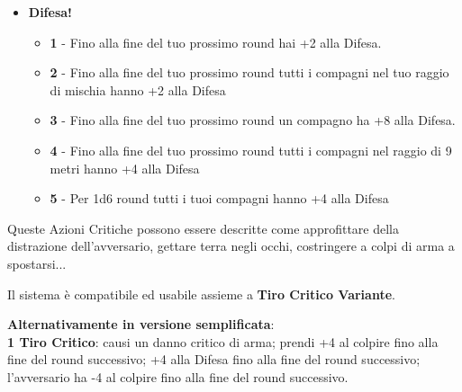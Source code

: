\begin{multicols}{2}
\begin{itemize}[leftmargin=*]
\begin{itemize}[leftmargin=*]
		\item \textbf{4} - Gloria. I tuoi compagni entro 6 metri hanno +2 al Tiro per Colpire entro la fine del loro prossimo round
		
		\item \textbf{5} - Gloria!. I tuoi compagni entro 9 metri hanno +4 al Tiro per Colpire entro la fine del loro prossimo round
	\end{itemize}
	
	\item \textbf{Difesa!}
	\begin{itemize}[leftmargin=*]
		\setlength{\itemsep}{0pt}
		\item \textbf{1} - Fino alla fine del tuo prossimo round hai +2 alla Difesa.
		
		\item \textbf{2} - Fino alla fine del tuo prossimo round tutti i compagni nel tuo raggio di mischia hanno +2 alla Difesa
		
		\item \textbf{3} - Fino alla fine del tuo prossimo round un compagno ha +8 alla Difesa.
		
		\item \textbf{4} - Fino alla fine del tuo prossimo round tutti i compagni nel raggio di 9 metri hanno +4 alla Difesa
		
		\item \textbf{5} - Per 1d6 round tutti i tuoi compagni hanno +4 alla Difesa
	\end{itemize}
	
\end{itemize}

\medskip

\begin{changemargin}{0.3cm}{0.3cm}\begin{narratore}
		Queste Azioni Critiche possono essere descritte come approfittare della distrazione dell'avversario, gettare terra negli occhi, costringere a colpi di arma a spostarsi...
		
		Il sistema è compatibile ed usabile assieme a \textbf{Tiro Critico Variante}.
\end{narratore}\end{changemargin}

\textbf{Alternativamente in versione semplificata}:\\

\textbf{1 Tiro Critico}: causi un danno critico di arma; prendi +4 al colpire fino alla fine del round successivo; +4 alla Difesa fino alla fine del round successivo; l'avversario ha -4 al colpire fino alla fine del round successivo.


\end{multicols}
